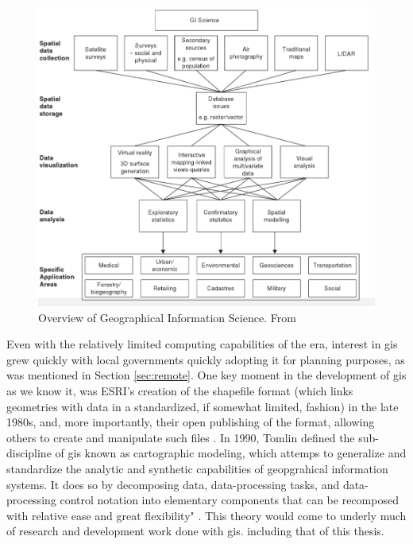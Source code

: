 \begin{figure}[h]
	\centering
	\includegraphics[scale=0.4]{Figures/chap2/GIScience.png}
	\caption[Overview of Geographical Information Science]{Overview of Geographical Information Science. From \cite{fotheringhamGeographicInformationScience2007}}
	\label{fig:giscience}
\end{figure}


Even with the relatively limited computing capabilities of the era, interest in \ac{gis} grew quickly with local governments quickly adopting it for planning purposes, as was mentioned in Section \ref{sec:remote}. One key moment in the development of \ac{gis} as we know it, was ESRI's creation of the shapefile format (which links geometries with data in a standardized, if somewhat limited, fashion) in the late 1980s, and, more importantly, their open publishing of the format, allowing others to create and manipulate such files \cite{goodchildModelingEarth2011}. In 1990, Tomlin defined the sub-discipline of \ac{gis} known as cartographic modeling, which attemps to generalize and standardize the analytic and synthetic capabilities of geopgrahical information systems. It does so by decomposing data, data-processing tasks, and data-processing control notation into elementary components that can be recomposed with relative ease and great flexibility" \cite{tomlinGISCartographicModeling2012}. This theory would come to underly much of research and development work done with \ac{gis}. including that of this thesis. 

